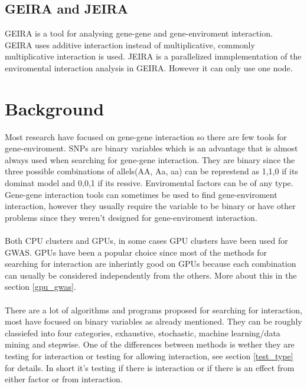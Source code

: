 \documentclass[10pt,a4paper]{article}
\begin{document}
\subsection{GEIRA and JEIRA}
GEIRA is a tool for analysing gene-gene and gene-enviroment interaction. GEIRA uses additive interaction instead of multiplicative, commonly multiplicative interaction is used\cite{geira}. JEIRA is a parallelized immplementation of the enviromental interaction analysis in GEIRA. However it can only use one node.

\clearpage
\section{Background}
Most research have focused on gene-gene interaction so there are few tools for gene-enviroment. SNPs are binary variables which is an advantage that is almost always used when searching for gene-gene interaction. They are binary since the three possible combinations of allels(AA, Aa, aa)  can be represtend as 1,1,0 if its dominat model and 0,0,1 if its ressive\cite{}. Enviromental factors can be of any type\cite{gene_enviroment_2013}. Gene-gene interaction tools can sometimes be used to find gene-enviroment interaction, however they usually require the variable to be binary or have other problems since they weren't designed for gene-enviroment interaction.\cite{gene_enviroment_2013}\\ %
\\
Both CPU clusters\cite{biforce} and GPUs\cite{gwis,gboost,gmdr_gpu,cuda_lr,genie_2012,plink_gpu}, in some cases GPU clusters\cite{gwis_conf} have been used for GWAS. GPUs have been a popular choice since most of the methods for searching for interaction are inherintly good on GPUs because each combination can usually be considered independently from the others. More about this in the section \ref{gpu_gwas}.\\
\\
There are a lot of algorithms and programs proposed for searching for interaction, most have focused on binary variables as already mentioned. They can be roughly classiefed into four categories, exhaustive, stochastic, machine learning/data mining and stepwise\cite{fast_high_order_cluster}. One of the differences between methods is wether they are testing for interaction or testing for allowing interaction, see section \ref{test_type} for details. In short it's testing if there is interaction or if there is an effect from either factor or from interaction.\\
\end{document}
